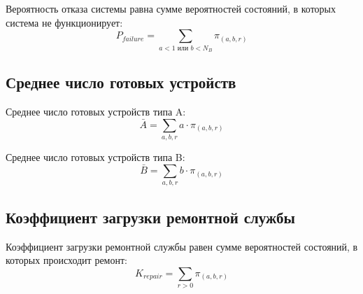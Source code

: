 Вероятность отказа системы равна сумме вероятностей состояний, в которых система не функционирует:
\begin{equation}
    P_{failure} = \sum_{a < 1 \text{ или } b < N_B} \pi_{(a,b,r)}
\end{equation}

\subsection{Среднее число готовых устройств}

Среднее число готовых устройств типа A:
\begin{equation}
    \bar{A} = \sum_{a,b,r} a \cdot \pi_{(a,b,r)}
\end{equation}

Среднее число готовых устройств типа B:
\begin{equation}
    \bar{B} = \sum_{a,b,r} b \cdot \pi_{(a,b,r)}
\end{equation}

\subsection{Коэффициент загрузки ремонтной службы}

Коэффициент загрузки ремонтной службы равен сумме вероятностей состояний, в которых происходит ремонт:
\begin{equation}
    K_{repair} = \sum_{r > 0} \pi_{(a,b,r)}
\end{equation}


\newpage
